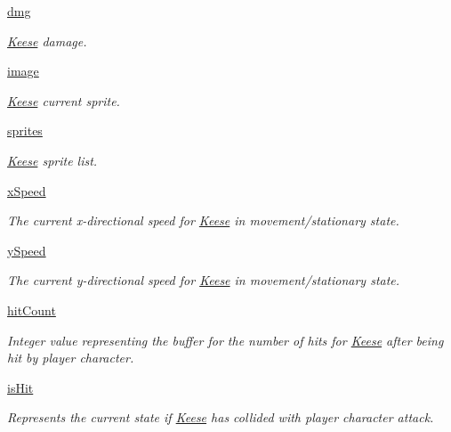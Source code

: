 \begin{DoxyCompactItemize}
\mbox{\label{classactor_1_1keese_1_1_keese_a2698d3b6a02884479d1613d236618728}} 
\hyperlink{classactor_1_1keese_1_1_keese_a2698d3b6a02884479d1613d236618728}{dmg}
\begin{DoxyCompactList}\small\item\em \hyperlink{classactor_1_1keese_1_1_keese}{Keese} damage. \end{DoxyCompactList}\item 
\hyperlink{classactor_1_1keese_1_1_keese_ae61225fd17e93f8441dae1eef5e41538}{image}
\begin{DoxyCompactList}\small\item\em \hyperlink{classactor_1_1keese_1_1_keese}{Keese} current sprite. \end{DoxyCompactList}\item 
\mbox{\label{classactor_1_1keese_1_1_keese_a0217078fcd7416adddc4d3671c3a653e}} 
\hyperlink{classactor_1_1keese_1_1_keese_a0217078fcd7416adddc4d3671c3a653e}{sprites}
\begin{DoxyCompactList}\small\item\em \hyperlink{classactor_1_1keese_1_1_keese}{Keese} sprite list. \end{DoxyCompactList}\item 
\hyperlink{classactor_1_1keese_1_1_keese_a4d93a0d3f92f4e23517b90e538d40467}{x\+Speed}
\begin{DoxyCompactList}\small\item\em The current x-\/directional speed for \hyperlink{classactor_1_1keese_1_1_keese}{Keese} in movement/stationary state. \end{DoxyCompactList}\item 
\hyperlink{classactor_1_1keese_1_1_keese_a6a288010700b821bc27840aa94faf35f}{y\+Speed}
\begin{DoxyCompactList}\small\item\em The current y-\/directional speed for \hyperlink{classactor_1_1keese_1_1_keese}{Keese} in movement/stationary state. \end{DoxyCompactList}\item 
\hyperlink{classactor_1_1keese_1_1_keese_a4cb2d09574c5b9590ea9f9d30c942a16}{hit\+Count}
\begin{DoxyCompactList}\small\item\em Integer value representing the buffer for the number of hits for \hyperlink{classactor_1_1keese_1_1_keese}{Keese} after being hit by player character. \end{DoxyCompactList}\item 
\hyperlink{classactor_1_1keese_1_1_keese_a88d77dbe81f2a8ab5e25bfb8bb1b2ae7}{is\+Hit}
\begin{DoxyCompactList}\small\item\em Represents the current state if \hyperlink{classactor_1_1keese_1_1_keese}{Keese} has collided with player character attack. \end{DoxyCompactList}\end{DoxyCompactItemize}


